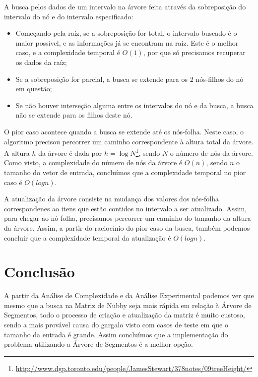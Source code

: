 \documentclass{article}
\begin{document}
A busca pelos dados de um intervalo na árvore feita através da sobreposição do intervalo do nó e do intervalo especificado:

\begin{itemize}
\item Começando pela raíz, se a sobreposição for total, o intervalo buscado é o maior possível, e as informações já se encontram na raíz. Este é o melhor caso, e a complexidade temporal é $O(1)$, por que só precisamos recuperar os dados da raíz;
\item Se a sobreposição for parcial, a busca se extende para os 2 nós-filhos do nó em questão;
\item Se não houver interseção alguma entre os intervalos do nó e da busca, a busca não se extende para os filhos deste nó.
\end{itemize}

O pior caso acontece quando a busca se extende até os nós-folha. Neste caso, o algoritmo precisou percorrer um caminho correspondente à altura total da árvore. A altura $h$ da árvore é dada por $h = \log N$\footnote{\url{http://www.dgp.toronto.edu/people/JamesStewart/378notes/09treeHeight/}}, sendo $N$ o número de nós da árvore. Como visto, a complexidade do número de nós da árvore é $O(n)$, sendo $n$ o tamanho do vetor de entrada, concluímos que a complexidade temporal no pior caso é $O(log n)$.

A atualização da árvore consiste na mudança dos valores dos nós-folha correspondenes ao itens que estão contidos no intervalo a ser atualizado. Assim, para chegar ao nó-folha, precisamos percorrer um caminho do tamanho da altura da árvore. Assim, a partir do raciocínio do pior caso da busca, também podemos concluir que a complexidade temporal da atualização é $O(log n)$.

\section{Conclusão}

A partir da Análise de Complexidade e da Análise Experimental podemos ver que mesmo que a busca na Matriz de Nubby seja mais rápida em relação à Árvore de Segmentos, todo o processo de criação e atualização da matriz é muito custoso, sendo a mais provável causa do gargalo visto com casos de teste em que o tamanho da entrada é grande. Assim concluímos que a implementação do problema utilizando a Árvore de Segmentos é a melhor opção.
\end{document}
